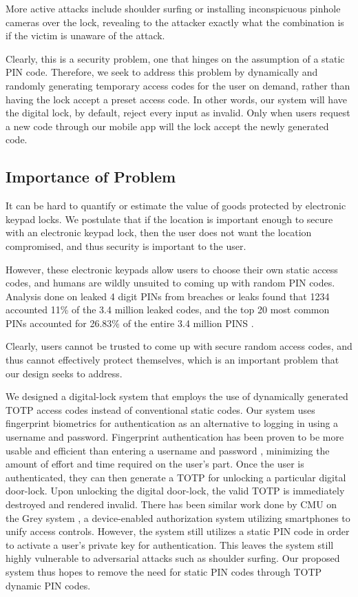 \documentclass[conference]{IEEEtran}
\begin{document}
More active attacks include shoulder surfing or installing inconspicuous pinhole cameras over the lock, revealing to the attacker exactly what the combination is if the victim is unaware of the attack. 

Clearly, this is a security problem, one that hinges on the assumption of a static PIN code. Therefore, we seek to address this problem by dynamically and randomly generating temporary access codes for the user on demand, rather than having the lock accept a preset access code. In other words, our system will have the digital lock, by default, reject every input as invalid. Only when users request a new code through our mobile app will the lock accept the newly generated code.

\subsection{Importance of Problem}
It can be hard to quantify or estimate the value of goods protected by electronic keypad locks. We postulate that if the location is important enough to secure with an electronic keypad lock, then the user does not want the location compromised, and thus security is important to the user. 

	However, these electronic keypads allow users to choose their own static access codes, and humans are wildly unsuited to coming up with random PIN codes. Analysis done on leaked 4 digit PINs from breaches or leaks found that 1234 accounted 11\% of the 3.4 million leaked codes, and the top 20 most common PINs accounted for 26.83\% of the entire 3.4 million PINS \cite{b1}.
	
	Clearly, users cannot be trusted to come up with secure random access codes, and thus cannot effectively protect themselves, which is an important problem that our design seeks to address.

	We designed a digital-lock system that employs the use of dynamically generated TOTP access codes instead of conventional static codes. Our system uses fingerprint biometrics for authentication as an alternative to logging in using a username and password. Fingerprint authentication has been proven to be more usable and efficient than entering a username and password \cite{b2}, minimizing the amount of effort and time required on the user’s part. Once the user is authenticated, they can then generate a TOTP for unlocking a particular digital door-lock. Upon unlocking the digital door-lock, the valid TOTP is immediately destroyed and rendered invalid. 
	There has been similar work done by CMU on the Grey system \cite{b3}, a device-enabled authorization system utilizing smartphones to unify access controls. However, the system still utilizes a static PIN code in order to activate a user’s private key for authentication. This leaves the system still highly vulnerable to adversarial attacks such as shoulder surfing. Our proposed system thus hopes to remove the need for static PIN codes through TOTP dynamic PIN codes. 
	
\end{document}

